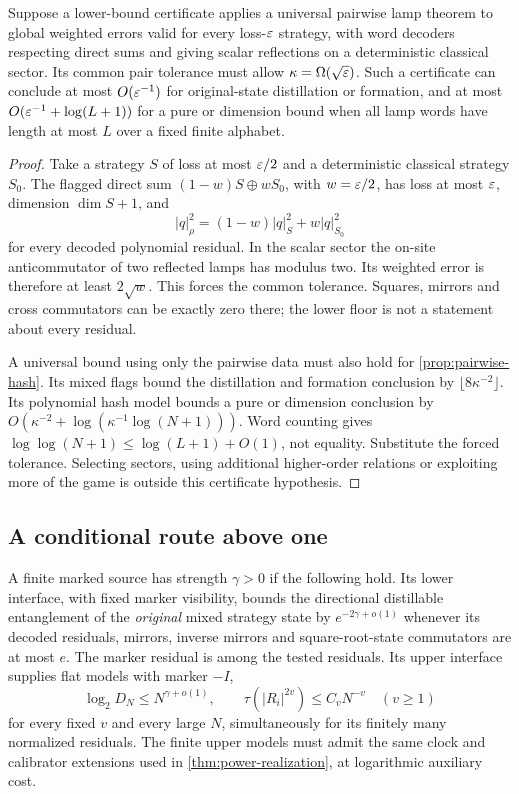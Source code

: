 \begin{proposition}\label{prop:pairwise-junk}
Suppose a lower-bound certificate applies a universal pairwise lamp theorem to global weighted errors valid for every loss-$\varepsilon$ strategy, with word decoders respecting direct sums and giving scalar reflections on a deterministic classical sector. Its common pair tolerance must allow $\kappa=\Omega(\sqrt{\varepsilon})$. Such a certificate can conclude at most $O(\varepsilon^{-1})$ for original-state distillation or formation, and at most $O(\varepsilon^{-1}+\log(L+1))$ for a pure or dimension bound when all lamp words have length at most $L$ over a fixed finite alphabet.
\end{proposition}
\begin{proof}
Take a strategy $S$ of loss at most $\varepsilon/2$ and a deterministic classical strategy $S_0$. The flagged direct sum $(1-w)S\oplus wS_0$, with $w=\varepsilon/2$, has loss at most $\varepsilon$, dimension $\dim S+1$, and
\[
 |q|_\rho^2=(1-w)|q|_S^2+w|q|_{S_0}^2
\]
for every decoded polynomial residual. In the scalar sector the on-site anticommutator of two reflected lamps has modulus two. Its weighted error is therefore at least $2\sqrt w$. This forces the common tolerance. Squares, mirrors and cross commutators can be exactly zero there; the lower floor is not a statement about every residual.

A universal bound using only the pairwise data must also hold for \cref{prop:pairwise-hash}. Its mixed flags bound the distillation and formation conclusion by $\lfloor8\kappa^{-2}\rfloor$. Its polynomial hash model bounds a pure or dimension conclusion by $O(\kappa^{-2}+\log(\kappa^{-1}\log(N+1)))$. Word counting gives $\log\log(N+1)\le\log(L+1)+O(1)$, not equality. Substitute the forced tolerance. Selecting sectors, using additional higher-order relations or exploiting more of the game is outside this certificate hypothesis.
\end{proof}

\subsection{A conditional route above one}\label{sec:stronger-source}
\begin{definition}\label{def:strong-source}
A finite marked source has strength $\gamma>0$ if the following hold. Its lower interface, with fixed marker visibility, bounds the directional distillable entanglement of the \emph{original} mixed strategy state by $e^{-2\gamma+o(1)}$ whenever its decoded residuals, mirrors, inverse mirrors and square-root-state commutators are at most $e$. The marker residual is among the tested residuals. Its upper interface supplies flat models with marker $-I$, 
\[
 \log_2D_N\le N^{\gamma+o(1)},\qquad
 \tau(|R_i|^{2v})\le C_vN^{-v}\quad(v\ge1)
\]
for every fixed $v$ and every large $N$, simultaneously for its finitely many normalized residuals. The finite upper models must admit the same clock and calibrator extensions used in \cref{thm:power-realization}, at logarithmic auxiliary cost.
\end{definition}

